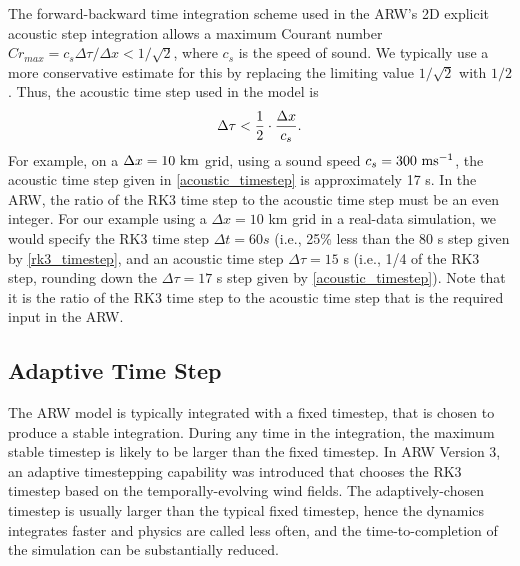 The forward-backward time integration scheme used in the ARW's 2D
explicit acoustic step integration allows a maximum Courant number
$Cr_{max} = c_s \Delta \tau/\Delta x < 1/\sqrt{2}$, where $c_s$ is the
speed of sound.  We typically use a more conservative estimate for this
by replacing the limiting value $1/\sqrt{2}$ with $1/2$.  Thus, the acoustic
time step used in the model is
%
\begin{equation}
\Delta \tau < {1 \over 2} \cdot {\Delta x \over c_s}.
\label{acoustic_timestep}
\end{equation}
%
\noindent
For example, on a $\Delta x = 10 \,\, \hbox{km}$ grid, using a sound
speed $c_s = 300 \,\, \hbox{ms}^{-1}$, the acoustic time step given in
\eqref{acoustic_timestep} is approximately 17 s.  In the ARW, the
ratio of the RK3 time step to the acoustic time step must be an even
integer.  For our example using a $\Delta x = 10$ km grid in a
real-data simulation, we would specify the RK3 time step $\Delta t = 60
s$ (i.e., 25\% less than the 80 s step given by \eqref{rk3_timestep},
and an acoustic time step $\Delta \tau = 15$ s (i.e., 1/4 of the RK3
step, rounding down the $\Delta \tau = 17$ s step given by
\eqref{acoustic_timestep}).  Note that it is the ratio of the RK3
time step to the acoustic time step that is the required input in the ARW.


\subsection{Adaptive Time Step}
\label{adaptive_time_step}

The ARW model is typically integrated with a fixed timestep, 
that is chosen to produce a stable integration.  During any time in
the integration, the maximum stable timestep is likely to be larger than
the fixed timestep.  In ARW Version 3, an adaptive timestepping capability was
introduced that chooses the RK3 timestep based on the temporally-evolving
wind fields.  The adaptively-chosen timestep is usually larger than the
typical fixed timestep, hence the dynamics integrates faster and
physics are called less often, and the time-to-completion of the
simulation can be substantially reduced.

